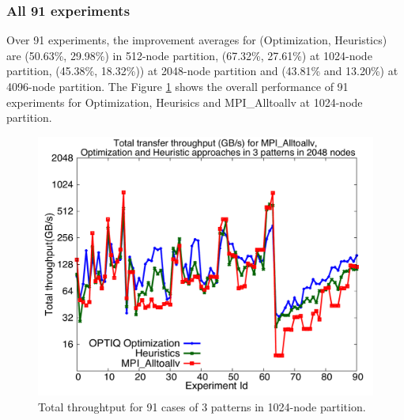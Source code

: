 \subsubsection{All 91 experiments}

Over 91 experiments, the improvement averages for (Optimization, Heuristics)  are (50.63\%, 29.98\%) in 512-node partition, (67.32\%, 27.61\%) at 1024-node partition, (45.38\%, 18.32\%)) at 2048-node partition and (43.81\% and 13.20\%) at 4096-node partition. The Figure \ref{fig:alltests_1k} shows the overall performance of 91 experiments for Optimization, Heurisics and MPI\_Alltoallv at 1024-node partition.

\begin{figure}[!htb]
\vspace{-0.15in}
\centering
\includegraphics[scale=0.30]{figures/alltests_1k.pdf}
\vspace{-0.15in}
\caption{Total throughtput for 91 cases of 3 patterns in 1024-node partition.}
\vspace{-0.15in}
\label{fig:alltests_1k}
\end{figure}
